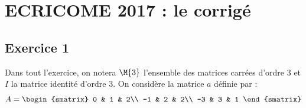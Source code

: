 \chapter*{ECRICOME 2017 : le corrigé}
  
%

\section*{Exercice 1}

\noindent
Dans tout l'exercice, on notera $\M{3}$ l'ensemble des matrices
carrées d'ordre $3$ et $I$ la matrice identité d'ordre $3$. On
considère la matrice $a$ définie par :
\[
A = 
\begin{smatrix}
  0 & 1 & 2\\
  -1 & 2 & 2\\
  -3 & 3 & 1
\end{smatrix}
\]

